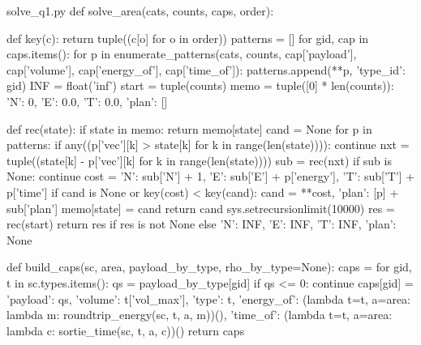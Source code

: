 \documentclass[bwprint]{gmcmthesis}
\begin{document}
\begin{appendices}
\begin{Python}{solve\_q1.py}
def solve_area(cats, counts, caps, order):

    def key(c):
        return tuple((c[o] for o in order))
    patterns = []
    for gid, cap in caps.items():
        for p in enumerate_patterns(cats, counts, cap['payload'], cap['volume'], cap['energy_of'], cap['time_of']):
            patterns.append({**p, 'type_id': gid})
    INF = float('inf')
    start = tuple(counts)
    memo = {tuple([0] * len(counts)): {'N': 0, 'E': 0.0, 'T': 0.0, 'plan': []}}

    def rec(state):
        if state in memo:
            return memo[state]
        cand = None
        for p in patterns:
            if any((p['vec'][k] > state[k] for k in range(len(state)))):
                continue
            nxt = tuple((state[k] - p['vec'][k] for k in range(len(state))))
            sub = rec(nxt)
            if sub is None:
                continue
            cost = {'N': sub['N'] + 1, 'E': sub['E'] + p['energy'], 'T': sub['T'] + p['time']}
            if cand is None or key(cost) < key(cand):
                cand = {**cost, 'plan': [p] + sub['plan']}
        memo[state] = cand
        return cand
    sys.setrecursionlimit(10000)
    res = rec(start)
    return res if res is not None else {'N': INF, 'E': INF, 'T': INF, 'plan': None}

def build_caps(sc, area, payload_by_type, rho_by_type=None):
    caps = {}
    for gid, t in sc.types.items():
        qs = payload_by_type[gid]
        if qs <= 0:
            continue
        caps[gid] = {'payload': qs, 'volume': t['vol_max'], 'type': t, 'energy_of': (lambda t=t, a=area: lambda m: roundtrip_energy(sc, t, a, m))(), 'time_of': (lambda t=t, a=area: lambda c: sortie_time(sc, t, a, c))()}
    return caps


\end{Python}
\end{appendices}
\end{document}
